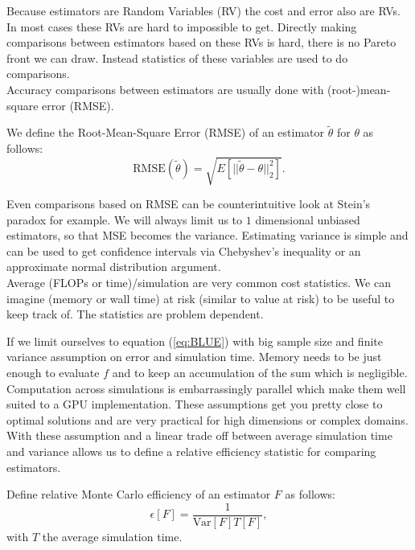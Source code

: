 \documentclass[a4paper,12pt]{article}
\begin{document}
Because estimators are Random Variables (RV)
the cost and error also are RVs. In most cases
these RVs are hard to impossible to get.
Directly making comparisons between estimators based on these
RVs is hard, there is no Pareto front we can draw.
Instead statistics of these variables are used
to do comparisons.\\

Accuracy comparisons between estimators
are usually done with (root-)mean-square error (RMSE).
\begin{definition}
    We define the Root-Mean-Square Error (RMSE) of an estimator $\tilde{\theta}$ for $\theta$  as follows:
    \begin{equation} \label{eq:BLUE}
        \text{RMSE}(\tilde{\theta}) = \sqrt{E[||\tilde{\theta}-\theta||^{2}_{2}]}.
    \end{equation}
\end{definition}

Even comparisons based on RMSE can be counterintuitive look at
Stein's paradox for example. We will always
limit us to $1$ dimensional unbiased estimators,
so that MSE becomes the variance.
Estimating variance is simple and can be used to
get confidence intervals via Chebyshev's inequality or
an approximate normal distribution argument.  \\

Average (FLOPs or time)/simulation are very common cost statistics.
We can imagine (memory or wall time) at risk (similar to value at risk) to be useful
to keep track of. The statistics are problem dependent.

If we limit ourselves to equation (\ref{eq:BLUE}) with big sample size and
finite variance assumption on error and simulation time.
Memory needs to be just enough to evaluate $f$ and to keep an accumulation
of the sum which is negligible.
Computation across simulations is embarrassingly parallel which
make them well suited to a GPU implementation. These assumptions get you
pretty close to optimal solutions and are very practical for high dimensions
or complex domains. With these assumption and a linear trade off between average simulation
time and variance allows us to define a relative efficiency statistic
for comparing estimators.

\begin{definition}
    Define relative Monte Carlo efficiency of an
    estimator $F$ as follows:
    \begin{equation}
        \epsilon[F]=\frac{1}{\text{Var}[F] T[F]},
    \end{equation}
    with $T$ the average simulation time.
\end{definition}
\end{document}
